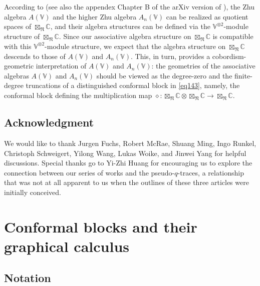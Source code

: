 \documentclass[11pt,b5paper,notitlepage]{article}
\theoremstyle{definition}
\theoremstyle{plain}
\newcommand{\Vbb}{\mathbb V}
\newcommand{\Cbb}{\mathbb C}
\newcommand{\<}{\left\langle}
\renewcommand{\>}{\right\rangle}
\newcommand{\fn}{\mathfrak{N}}
\numberwithin{equation}{section}
\begin{document}
According to \cite{Li-regular-Zhu,Li-regular-AnV} (see also the appendex Chapter B of the arXiv version of \cite{GZ1}), the Zhu algebra $A(\Vbb)$ and the higher Zhu algebra $A_n(\Vbb)$ can be realized as quotient spaces of $\boxtimes_\fn\Cbb$, and their algebra structures can be defined via the $\Vbb^{\otimes2}$-module structure of $\boxtimes_\fn\Cbb$. Since our associative algebra structure on $\boxtimes_\fn\Cbb$ is compatible with this $\Vbb^{\otimes2}$-module structure, we expect that the algebra structure on $\boxtimes_\fn\Cbb$ descends to those of $A(\Vbb)$ and $A_n(\Vbb)$. This, in turn, provides a cobordism-geometric interpretation of $A(\Vbb)$ and $A_n(\Vbb)$: the geometries of the associative algebras $A(\Vbb)$ and $A_n(\Vbb)$ should be viewed as the degree-zero and the finite-degree truncations of a distinguished conformal block in \eqref{eq143}, namely, the conformal block defining the multiplication map $\diamond:\boxtimes_\fn\Cbb\otimes\boxtimes_\fn\Cbb\rightarrow\boxtimes_\fn\Cbb$.





\subsection*{Acknowledgment}

We would like to thank Jurgen Fuchs, Robert McRae, Shuang Ming, Ingo Runkel, Christoph Schweigert, Yilong Wang,  Lukas Woike, and Jinwei Yang for helpful discussions. Special thanks go to Yi-Zhi Huang for encouraging us to explore the connection between our series of works \cite{GZ1,GZ2,GZ3} and the pseudo-$q$-traces, a relationship that was not at all apparent to us when the outlines of these three articles were initially conceived.














\section{Conformal blocks and their graphical calculus}



\subsection{Notation}\label{lb32}
\end{document}

